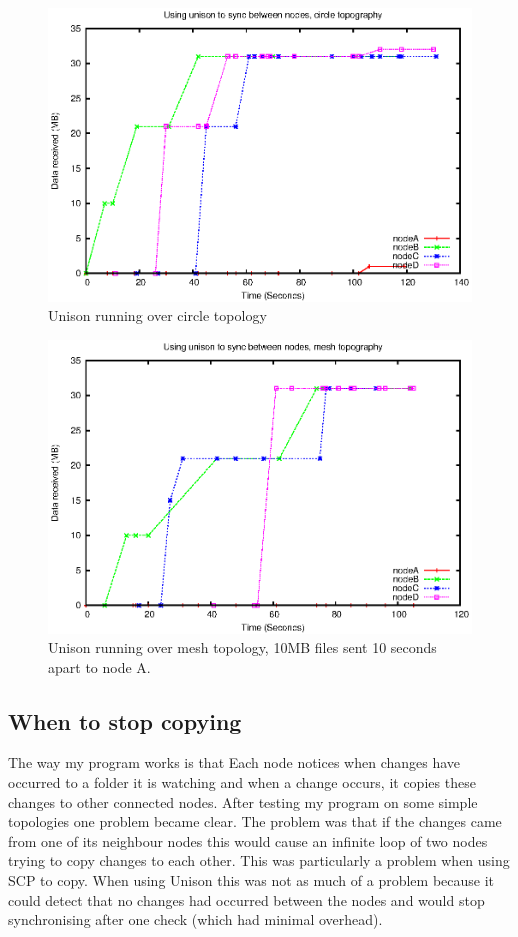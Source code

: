 \documentclass[12pt]{article}
\begin{document}
\begin{figure}[hb!]
    \centering
    \includegraphics[height=0.5\textheight]{images/circ-uni-almost.eps}
    \caption{Unison running over circle topology}
    \label{fig:full_circ_uni}
\end{figure}
\begin{figure}[ht!]
    \centering
    \includegraphics[height=0.5\textheight]{images/mesh-uni-almost.eps}
    \caption{Unison running over mesh topology, 10MB files sent 10 seconds
    apart to node A.}
    \label{fig:full_mesh_uni}
\end{figure}

\newpage
\subsection{When to stop copying}
The way my program works is that Each node notices when changes
have occurred to a folder it is watching and when a change occurs,
it copies these changes to other connected nodes.
After testing my program on some simple topologies one problem became
clear. 
The problem was that if the changes
came from one of its neighbour nodes this would cause an infinite loop
of two nodes trying to copy changes to each other. This was particularly 
a problem when using SCP to copy. When using Unison this was not as much of
a problem because it could detect that no changes had occurred between the nodes
and would stop synchronising after one check (which had minimal overhead).
\end{document}
